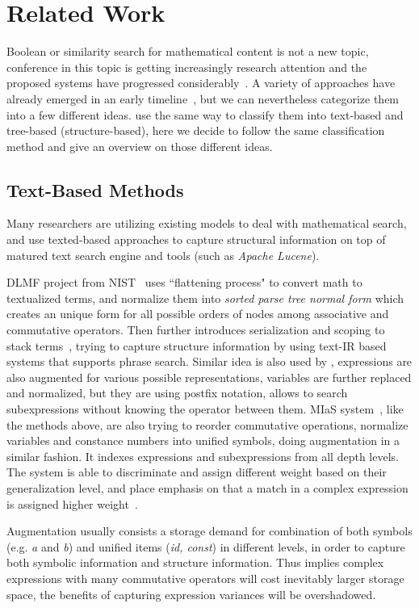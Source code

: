 \chapter{Related Work}
\label{relatedwork}
Boolean or similarity search for mathematical content is not a new topic, conference in this topic is getting increasingly research attention and the proposed systems have progressed considerably~\cite{ov}. 
A variety of approaches have already emerged in an early timeline~\cite{egomath13}, but we can nevertheless categorize them into a few different ideas.
\cite{WikiMirs13,symbolpairs15,Youssef14} use the same way to classify them into text-based and tree-based (structure-based),
here we decide to follow the same classification method and give an overview on those different ideas.

\section{Text-Based Methods}
Many researchers are utilizing existing models to deal with mathematical search, and use texted-based approaches to capture structural information on top of matured text search engine and tools (such as \textit{Apache Lucene}). 

DLMF project from NIST~\cite{Youssef03} uses ``flattening process" to convert math to textualized terms, and normalize them into \textit{sorted parse tree normal form} which creates an unique form for all possible orders of nodes among associative and commutative operators. 
Then further introduces serialization and scoping to stack terms~\cite{Youssef05}, trying to capture structure information by using text-IR based systems that supports phrase search. 
Similar idea is also used by \cite{extending08}, expressions are also augmented for various possible representations, variables are further replaced and normalized, but they are using postfix notation, allows to search subexpressions without knowing the operator between them.  
MIaS system~\cite{mias11a,mias11,mias:thesis}, like the methods above, are also trying to reorder commutative operations, normalize variables and constance numbers into unified symbols, doing augmentation in a similar fashion. 
It indexes expressions and subexpressions from all depth levels. The system is able to discriminate and assign different weight based on their generalization level, and place emphasis on that a match in a complex expression is assigned higher weight~\cite{mias:thesis}.

Augmentation usually consists a storage demand for combination of both symbols (e.g. \textit{a} and \textit{b}) and unified items (\textit{id, const}) in different levels, in order to capture both symbolic information and structure information. Thus implies complex expressions with many commutative operators will cost inevitably larger storage space, the benefits of capturing expression variances will be overshadowed.

